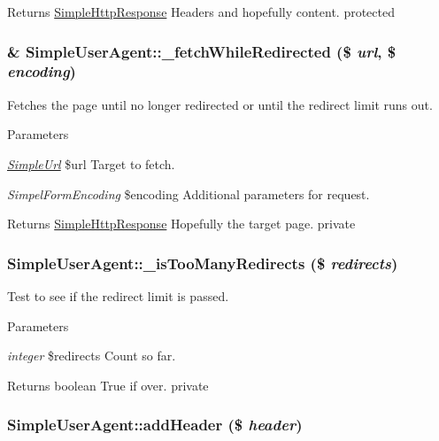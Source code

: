 \begin{DoxyReturn}{Returns}
\hyperlink{class_simple_http_response}{SimpleHttpResponse} Headers and hopefully content.  protected 
\end{DoxyReturn}
\hypertarget{class_simple_user_agent_ab2268d6a93017a4b9c6f91a09a7859c1}{
\subsubsection[{\_\-fetchWhileRedirected}]{\setlength{\rightskip}{0pt plus 5cm}\& SimpleUserAgent::\_\-fetchWhileRedirected (\$ {\em url}, \/  \$ {\em encoding})}}
\label{class_simple_user_agent_ab2268d6a93017a4b9c6f91a09a7859c1}
Fetches the page until no longer redirected or until the redirect limit runs out. 
\begin{DoxyParams}{Parameters}
\item[{\em \hyperlink{class_simple_url}{SimpleUrl}}]\$url Target to fetch. \item[{\em SimpelFormEncoding}]\$encoding Additional parameters for request. \end{DoxyParams}
\begin{DoxyReturn}{Returns}
\hyperlink{class_simple_http_response}{SimpleHttpResponse} Hopefully the target page.  private 
\end{DoxyReturn}
\hypertarget{class_simple_user_agent_a8004bb1aa6c9b9205ce8f5fc16acbdb3}{
\subsubsection[{\_\-isTooManyRedirects}]{\setlength{\rightskip}{0pt plus 5cm}SimpleUserAgent::\_\-isTooManyRedirects (\$ {\em redirects})}}
\label{class_simple_user_agent_a8004bb1aa6c9b9205ce8f5fc16acbdb3}
Test to see if the redirect limit is passed. 
\begin{DoxyParams}{Parameters}
\item[{\em integer}]\$redirects Count so far. \end{DoxyParams}
\begin{DoxyReturn}{Returns}
boolean True if over.  private 
\end{DoxyReturn}
\hypertarget{class_simple_user_agent_afa939a53c88a70147c399dbc3c8b664c}{
\subsubsection[{addHeader}]{\setlength{\rightskip}{0pt plus 5cm}SimpleUserAgent::addHeader (\$ {\em header})}}
